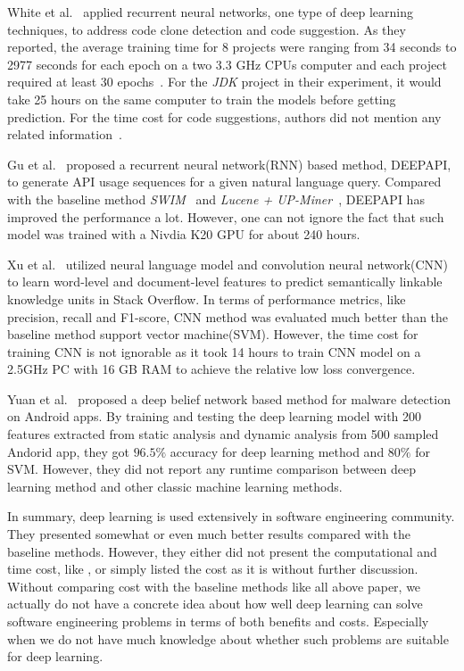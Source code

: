 \documentclass[sigconf,review, anonymous]{acmart}
\theoremstyle{break}
\begin{document}
 White et al.~\cite{white2015toward, white2016deep} applied
 recurrent neural networks, one type of  deep learning techniques, 
 to address code clone detection and code suggestion. As they reported,
 the average training time for 8 projects were ranging from 34 seconds
  to 2977 seconds for each epoch on a two 3.3 GHz
 CPUs computer and each project required at least 30 epochs~\cite{white2016deep}.
 For the {\it JDK} project in their experiment, it would take 25 hours 
 on the same computer to train the models before getting prediction.
 For the time cost for code suggestions, authors did not mention any related information~\cite{white2015toward}.

Gu et al.~\cite{gu2016deep} proposed  a recurrent neural network(RNN)
 based method, D{\scriptsize EEP}API, to generate API usage sequences for a given natural language query. 
 Compared with the baseline method {\it SWIM}~\cite{raghothaman2016swim} and 
 {\it Lucene + UP-Miner}~\cite{wang2013mining},  D{\scriptsize EEP}API has improved the performance a lot.
 However, one can not ignore the fact that such model was trained with a Nivdia K20 GPU for about 240 hours.
 
 Xu et al.~\cite{xu2016predicting} utilized neural language model and  
 convolution neural network(CNN) to  learn word-level and document-level features to
 predict semantically linkable knowledge units in Stack Overflow. 
 In terms of performance metrics, like precision, recall and F1-score,
 CNN method was evaluated much better than 
 the baseline method support vector machine(SVM). 
 However, the time cost for training CNN is not ignorable as it took
 14 hours to train CNN model on a 2.5GHz PC with 16 GB RAM 
 to achieve the relative low loss convergence.
 
 Yuan et al.~\cite{yuan2014droid} proposed a deep belief network based method for
 malware detection on Android apps. By training and testing
 the deep learning model with  200 features extracted
 from static analysis and dynamic analysis from 500 sampled Andorid app, they
 got $96.5\%$ accuracy for deep learning method  and $80\%$ for SVM.
 However, they did not report any runtime comparison between deep learning method and 
 other classic machine learning methods.
 
 In summary,  deep learning is used extensively in software
 engineering community. They presented somewhat or even much better results compared with
 the baseline methods. However, they either did not present the computational and time cost, like \cite{white2016deep,white2015toward,lam2015combining,choetkiertikul2016deep,yuan2014droid}, or simply listed
 the cost as it is without further discussion\cite{wang2016automatically, gu2016deep, xu2016predicting}. Without comparing cost with the baseline methods like all above paper,
 we actually do not have a concrete idea about how well deep learning can solve software engineering problems in terms of both benefits and costs. Especially when we do not have much knowledge about
 whether such problems are suitable for deep learning. 
 
\end{document}
